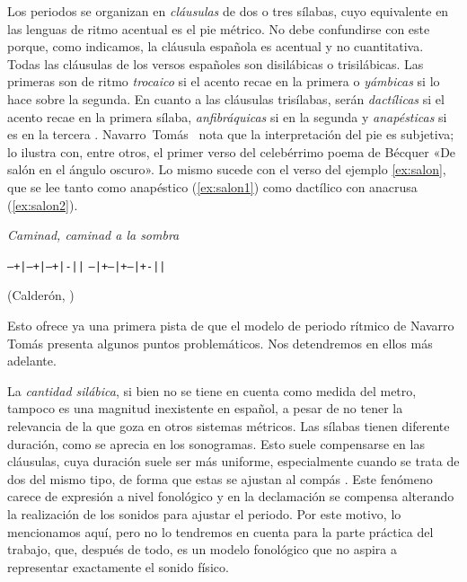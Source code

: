 Los periodos se organizan en \textit{cláusulas} de dos o tres sílabas, cuyo equivalente en las lenguas de ritmo acentual es el pie métrico. No debe confundirse con este porque, como indicamos, la cláusula española es acentual y no cuantitativa. Todas las cláusulas de los versos españoles son disilábicas o trisilábicas. Las primeras son de ritmo \textit{trocaico} si el acento recae en la primera o \textit{yámbicas} si lo hace sobre la segunda. En cuanto a las cláusulas trisílabas, serán \textit{dactílicas} si el acento recae en la primera sílaba, \textit{anfibráquicas} si en la segunda y \textit{anapésticas} si es en la tercera \parencite[141-142]{bello1981}. Navarro~Tomás~\parencite*[37]{navarrotomas1991} nota que la interpretación del pie es subjetiva; lo ilustra con, entre otros, el primer verso del celebérrimo poema de Bécquer «De salón en el ángulo oscuro». Lo mismo sucede con el verso del ejemplo \ref{ex:salon}, que se lee tanto como anapéstico (\ref{ex:salon1}) como dactílico con anacrusa (\ref{ex:salon2}).
\begin{exe}
	\ex\label{ex:salon}\textit{Caminad, caminad a la sombra}
	\begin{xlist}
		\ex\label{ex:salon1}\texttt{--+|--+|--+|-||}
		\ex\label{ex:salon2}\texttt{--|+--|+--|+-||}
	\end{xlist}
\strut\hfill(Calderón, )
\end{exe}

Esto ofrece ya una primera pista de que el modelo de periodo rítmico de Navarro Tomás presenta algunos puntos problemáticos. Nos detendremos en ellos más adelante.

La \textit{cantidad silábica}, si bien no se tiene en cuenta como medida del metro, tampoco es una magnitud inexistente en español, a pesar de no tener la relevancia de la que goza en otros sistemas métricos. Las sílabas tienen diferente duración, como se aprecia en los sonogramas. Esto suele compensarse en las cláusulas, cuya duración suele ser más uniforme, especialmente cuando se trata de dos del mismo tipo, de forma que estas se ajustan al compás \parencite[37]{navarrotomas1991}. Este fenómeno carece de expresión a nivel fonológico y en la declamación se compensa alterando la realización de los sonidos para ajustar el periodo. Por este motivo, lo mencionamos aquí, pero no lo tendremos en cuenta para la parte práctica del trabajo, que, después de todo, es un modelo fonológico que no aspira a representar exactamente el sonido físico.

